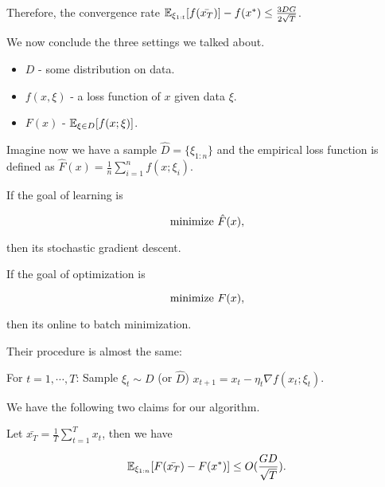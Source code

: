 \documentclass[../main.tex]{subfiles}
\begin{document}
Therefore, the convergence rate $\mathbb{E}_{\xi_{1:t}} [f(\bar{x_T})] - f(x^*) \leq \frac{3DG}{2\sqrt{T}}$.


We now conclude the three settings we talked about.

\begin{itemize}
	\item $D$ - some distribution on data.
	\item $f(x, \xi)$ - a loss function of $x$ given data $\xi$.
	\item $F(x)$ - $\mathbb{E}_{\xi \in D} [f(x;\xi)]$.
\end{itemize}

Imagine now we have a sample $\hat{D} = \{\xi_{1:n}\}$ and the empirical loss function is defined as $\hat{F}(x) = \frac{1}{n} \sum\limits_{i=1}^n f(x;\xi_i)$.

If the goal of learning is 

\begin{equation*}
	\textmd{minimize} \ \hat{F}(x),
\end{equation*} 

then its stochastic gradient descent.

If the goal of optimization is 

\begin{equation*}
\textmd{minimize} \ F(x),
\end{equation*} 

then its online to batch minimization.


Their procedure is almost the same:

\begin{algorithm}
	\begin{algorithmic}
		\STATE For $t = 1,\cdots ,T$:
		\bindent 
		\STATE Sample $\xi_t \sim D$ (or $\hat{D}$)
		\STATE $x_{t+1} = x_t - \eta_t\nabla f(x_t; \xi_t)$.
		\eindent
	\end{algorithmic}
\end{algorithm}


We have the following two claims for our algorithm.

\begin{claim}\label{claim_online_batch}
	Let $\bar{x_T} = \frac{1}{T} \sum\limits_{t=1}^T x_t$, then we have
	
	\begin{equation}
		\mathbb{E}_{\xi_{1:n}} [F(\bar{x_T}) - F(x^*)] \leq O(\frac{GD}{\sqrt{T}}).
 	\end{equation}
\end{claim}
\end{document}
